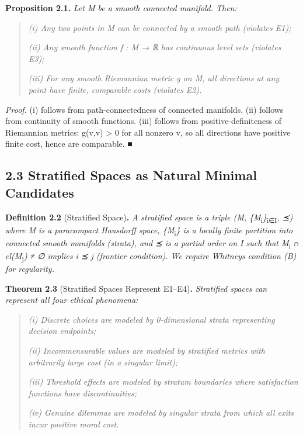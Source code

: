 \documentclass[12pt]{article}
\theoremstyle{plain}
\theoremstyle{definition}
\theoremstyle{remark}
\begin{document}
\textbf{Proposition 2.1.} \emph{Let M be a smooth connected manifold.
Then:}

\begin{quote}
\emph{(i) Any two points in M can be connected by a smooth path
(violates E1);}

\emph{(ii) Any smooth function f : M → ℝ has continuous level sets
(violates E3);}

\emph{(iii) For any smooth Riemannian metric g on M, all directions at
any point have finite, comparable costs (violates E2).}
\end{quote}

\emph{Proof.} (i) follows from path-connectedness of connected
manifolds. (ii) follows from continuity of smooth functions. (iii)
follows from positive-definiteness of Riemannian metrics: g(v,v)
\textgreater{} 0 for all nonzero v, so all directions have positive
finite cost, hence are comparable. ■

\subsection{2.3 Stratified Spaces as Natural Minimal
Candidates}\label{stratified-spaces-as-natural-minimal-candidates}

\textbf{Definition 2.2} (Stratified Space)\textbf{.} \emph{A stratified
space is a triple (M,
\{M}\textsubscript{i}\emph{\}}\textsubscript{i∈I}\emph{, ⪯) where M is a
paracompact Hausdorff space, \{M}\textsubscript{i}\emph{\} is a locally
finite partition into connected smooth manifolds (strata), and ⪯ is a
partial order on I such that M}\textsubscript{i} \emph{∩
cl(M}\textsubscript{j}\emph{) ≠ ∅ implies i ⪯ j (frontier condition). We
require Whitney\textquotesingle s condition (B) for regularity.}

\textbf{Theorem 2.3} (Stratified Spaces Represent E1--E4)\textbf{.}
\emph{Stratified spaces can represent all four ethical phenomena:}

\begin{quote}
\emph{(i) Discrete choices are modeled by 0-dimensional strata
representing decision endpoints;}

\emph{(ii) Incommensurable values are modeled by stratified metrics with
arbitrarily large cost (in a singular limit);}

\emph{(iii) Threshold effects are modeled by stratum boundaries where
satisfaction functions have discontinuities;}

\emph{(iv) Genuine dilemmas are modeled by singular strata from which
all exits incur positive moral cost.}
\end{quote}
\end{document}
